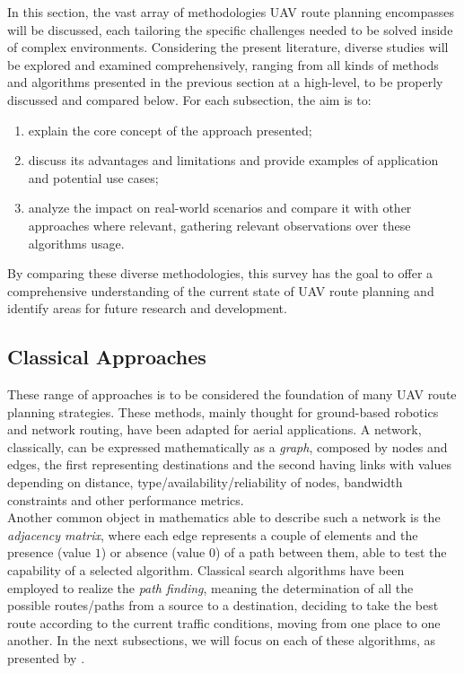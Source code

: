 \documentclass[conference]{IEEEtran}
\begin{document}
In this section, the vast array of methodologies UAV route planning encompasses will be discussed, each tailoring the specific challenges needed to be solved inside of complex environments. Considering the present literature, diverse studies will be explored and examined comprehensively, ranging from all kinds of methods and algorithms presented in the previous section at a high-level, to be properly discussed and compared below. 
For each subsection, the aim is to:
\begin{enumerate}
    \item explain the core concept of the approach presented;
    \item discuss its advantages and limitations and provide examples of application and potential use cases;
    \item analyze the impact on real-world scenarios and compare it with other approaches where relevant, gathering relevant observations over  these algorithms usage.
\end{enumerate}

By comparing these diverse methodologies, this survey has the goal to offer a comprehensive understanding of the current state of UAV route planning and identify areas for future research and development.

\subsection{Classical Approaches}

These range of approaches is to be considered the foundation of many UAV route planning strategies. These methods, mainly thought for ground-based robotics and network routing, have been adapted for aerial applications. A network, classically, can be expressed mathematically as a \textit{graph}, composed by nodes and edges, the first representing destinations and the second having links with values depending on distance, type/availability/reliability of nodes, bandwidth constraints and other performance metrics. \\

Another common object in mathematics able to describe such a network is the \textit{adjacency matrix}, where each edge represents a couple of elements and the presence (value $1$) or absence (value $0$) of a path between them, able to test the capability of a selected algorithm. Classical search algorithms have been employed to realize the\textit{ path finding}, meaning the determination of all the possible routes/paths from a source to a destination, deciding to take the best route according to the current traffic conditions, moving from one place to one another.
In the next subsections, we will focus on each of these algorithms, as presented by \cite{paper1}. \\
\end{document}
